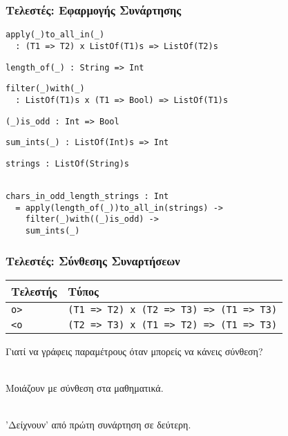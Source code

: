 \documentclass{beamer}
\def\e{\foreignlanguage{english}}
\begin{document}
\begin{frame}[fragile]

\frametitle{Τελεστές: Εφαρμογής Συνάρτησης}

\begin{otherlanguage}{english}

\begin{verbatim}
apply(_)to_all_in(_)
  : (T1 => T2) x ListOf(T1)s => ListOf(T2)s
\end{verbatim}
\begin{verbatim}
length_of(_) : String => Int
\end{verbatim}
\begin{verbatim}
filter(_)with(_)
  : ListOf(T1)s x (T1 => Bool) => ListOf(T1)s
\end{verbatim}
\begin{verbatim}
(_)is_odd : Int => Bool
\end{verbatim}
\begin{verbatim}
sum_ints(_) : ListOf(Int)s => Int
\end{verbatim}
\begin{verbatim}
strings : ListOf(String)s
\end{verbatim}
\begin{verbatim}

chars_in_odd_length_strings : Int
  = apply(length_of(_))to_all_in(strings) ->
    filter(_)with((_)is_odd) ->
    sum_ints(_)
\end{verbatim}

\end{otherlanguage}

\end{frame}

\begin{frame}

\frametitle{Τελεστές: Σύνθεσης Συναρτήσεων}

\begin{center}
\begin{tabular}{ |P{2cm}|P{8cm}| }
 \hline
 Τελεστής & Τύπος
 \\
 \hline
 \e{\texttt{o>}} & \e{\texttt{(T1 => T2) x (T2 => T3) => (T1 => T3)}}
 \\
 \e{\texttt{<o}} & \e{\texttt{(T2 => T3) x (T1 => T2) => (T1 => T3)}}
 \\
 \hline
\end{tabular}
\end{center}

Γιατί να γράφεις παραμέτρους όταν μπορείς να κάνεις σύνθεση?
\\~\

Μοιάζουν με σύνθεση στα μαθηματικά.
\\~\

'Δείχνουν' από πρώτη συνάρτηση σε δεύτερη.
\\~\
\end{frame}
\end{document}
